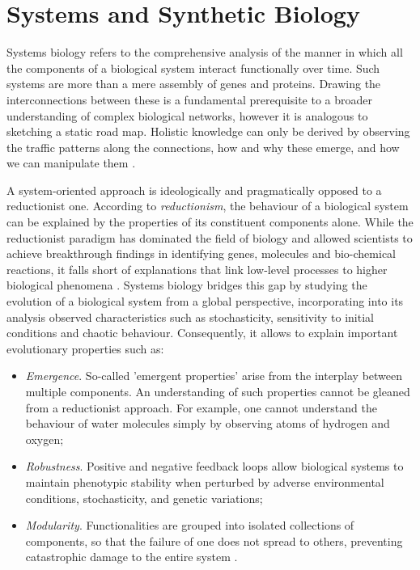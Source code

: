 \documentclass[bsc,frontabs,singlespacing,parskip,deptreport]{infthesis}
\begin{document}
\section{Systems and Synthetic Biology}\label{sec:systems_synth_bio}

Systems biology refers to the comprehensive analysis of the manner in which all the components of a biological system interact functionally over time. Such systems are more than a mere assembly of genes and proteins. Drawing the interconnections between these is a fundamental prerequisite to a broader understanding of complex biological networks, however it is analogous to sketching a static road map. Holistic knowledge can only be derived by observing the traffic patterns along the connections, how and why these emerge, and how we can manipulate them \cite{Kitano02systemsbiology:}. 

A system-oriented approach is ideologically and pragmatically opposed to a reductionist one. According to \textit{reductionism}, the behaviour of a biological system can be explained by the properties of its constituent components alone. While the reductionist paradigm has dominated the field of biology and allowed scientists to achieve breakthrough findings in identifying genes, molecules and bio-chemical reactions, it falls short of explanations that link low-level processes to higher biological phenomena \cite{KESIC2016584}. Systems biology bridges this gap by studying the evolution of a biological system from a global perspective, incorporating into its analysis observed characteristics such as stochasticity, sensitivity to initial conditions and chaotic behaviour. Consequently, it allows to explain important evolutionary properties such as:

\begin{itemize}
    \item \textit{Emergence}. So-called 'emergent properties' arise from the interplay between multiple components. An understanding of such properties cannot be gleaned from a reductionist approach. For example, one cannot understand the behaviour of water molecules simply by observing atoms of hydrogen and oxygen;
    \item \textit{Robustness}. Positive and negative feedback loops allow biological systems to maintain phenotypic stability when perturbed by adverse environmental conditions, stochasticity, and genetic variations;
    \item \textit{Modularity}. Functionalities are grouped into isolated collections of components, so that the failure of one does not spread to others, preventing catastrophic damage to the entire system \cite{pmid15907465}.
\end{itemize}
\end{document}
